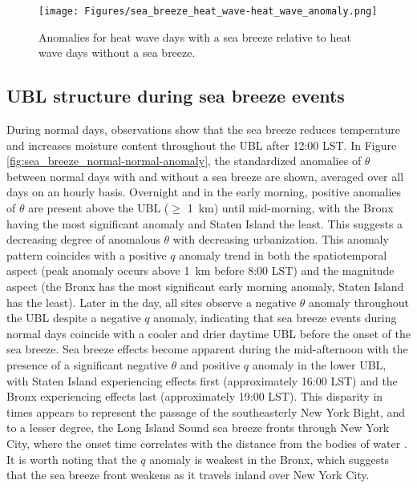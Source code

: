 \begin{figure}[ht]
	\centering
	\texttt{[image: Figures/sea\_breeze\_heat\_wave-heat\_wave\_anomaly.png]}
	\caption{Anomalies for heat wave days with a sea breeze relative to heat wave days without a sea breeze.}
	\label{fig:sea_breeze_heat_wave_anomaly}
\end{figure}

\FloatBarrier

\subsection{UBL structure during sea breeze events}
During normal days, observations show that the sea breeze reduces temperature and increases moisture content throughout the UBL after 12:00 LST. In Figure \ref{fig:sea_breeze_normal-normal-anomaly}, the standardized anomalies of $\theta$ between normal days with and without a sea breeze are shown, averaged over all days on an hourly basis. Overnight and in the early morning, positive anomalies of $\theta$ are present above the UBL ($\geq$ \SI{1}{\kilo\meter}) until mid-morning, with the Bronx having the most significant anomaly and Staten Island the least. This suggests a decreasing degree of anomalous $\theta$ with decreasing urbanization. This anomaly pattern coincides with a positive $q$ anomaly trend in both the spatiotemporal aspect (peak anomaly occurs above \SI{1}{\kilo\meter} before 8:00 LST) and the magnitude aspect (the Bronx has the most significant early morning anomaly, Staten Island has the least). Later in the day, all sites observe a negative $\theta$ anomaly throughout the UBL despite a negative $q$ anomaly, indicating that sea breeze events during normal days coincide with a cooler and drier daytime UBL before the onset of the sea breeze. Sea breeze effects become apparent during the mid-afternoon with the presence of a significant negative $\theta$ and positive $q$ anomaly in the lower UBL, with Staten Island experiencing effects first (approximately 16:00 LST) and the Bronx experiencing effects last (approximately 19:00 LST). This disparity in times appears to represent the passage of the southeasterly New York Bight, and to a lesser degree, the Long Island Sound sea breeze fronts through New York City, where the onset time correlates with the distance from the bodies of water \citep{bornstein1981}. It is worth noting that the $q$ anomaly is weakest in the Bronx, which suggests that the sea breeze front weakens as it travels inland over New York City.

